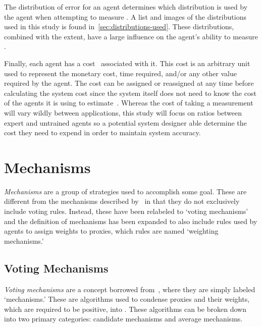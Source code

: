 The distribution of error for an agent determines which distribution is used by the
agent when attempting to measure \truth.
A list and images of the distributions used in this study is found
in~\autoref{sec:distributions-used}.
These distributions, combined with the extent, have a large influence on the
agent's ability to measure \truth.

Finally, each agent has a cost \agentcost\ associated with it.
This cost is an arbitrary unit used to represent the monetary cost, time
required, and/or any other value required by the agent.
The cost can be assigned or reassigned at any time before calculating the
system cost since the system itself does not need to know the cost of the
agents it is using to estimate~\truth.
Whereas the cost of taking a measurement will vary wildly between applications, this
study will focus on ratios between expert and untrained agents so a potential system
designer able determine the cost they need to expend in order to maintain system
accuracy.



\section{Mechanisms}\label{sec:mechanisms}
\textit{Mechanisms} are a group of strategies used to accomplish some goal.
These are different from the mechanisms described by~\cite{Cohensius2017} in
that they do not exclusively include voting rules.
Instead, these have been relabeled to `voting mechanisms' and the definition
of mechanisms has been expanded to also include rules used by agents to
assign weights to proxies, which rules are named `weighting mechanisms.'

\subsection{Voting Mechanisms}\label{subsec:voting-mechanisms}
\textit{Voting mechanisms} are a concept borrowed from~\cite{Cohensius2017},  
where they are simply labeled `mechanisms.'
These are algorithms used to condense proxies and their weights, which are
required to be positive, into \systemtruth.
These algorithms can be broken down into two primary categories: candidate
mechanisms and average mechanisms.

